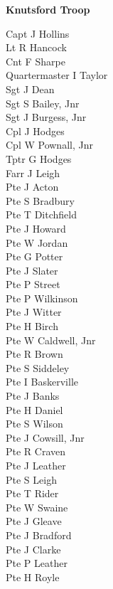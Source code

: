 \begin{center}
  \Large
  \textbf{Knutsford Troop}
\end{center}

\begin{multicols}{2}
  \noindent
  Capt J Hollins \\
  Lt R Hancock \\
  Cnt F Sharpe \\
  Quartermaster I Taylor \\
  Sgt J Dean \\
  Sgt S Bailey, Jnr \\
  Sgt J Burgess, Jnr \\
  Cpl J Hodges \\
  Cpl W Pownall, Jnr \\
  Tptr G Hodges \\
  Farr J Leigh \\
  Pte J Acton \\
  Pte S Bradbury \\
  Pte T Ditchfield \\
  Pte J Howard \\
  Pte W Jordan \\
  Pte G Potter \\
  Pte J Slater \\
  Pte P Street \\
  Pte P Wilkinson \\
  Pte J Witter \\
  Pte H Birch \\
  Pte W Caldwell, Jnr \\
  Pte R Brown \\
  Pte S Siddeley \\
  Pte I Baskerville \\
  Pte J Banks \\
  Pte H Daniel \\
  Pte S Wilson \\
  Pte J Cowsill, Jnr \\
  Pte R Craven \\
  Pte J Leather \\
  Pte S Leigh \\
  Pte T Rider \\
  Pte W Swaine \\
  Pte J Gleave \\
  Pte J Bradford \\
  Pte J Clarke \\
  Pte P Leather \\
  Pte H Royle \\

\end{multicols}
